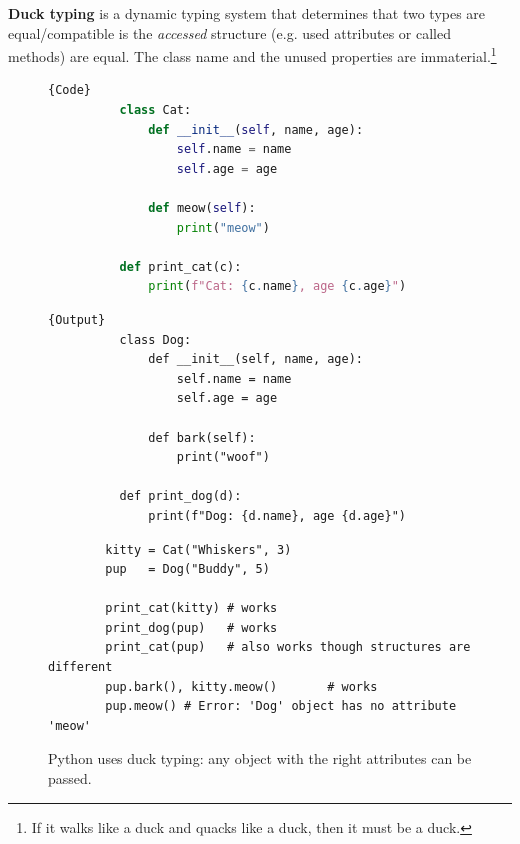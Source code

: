   \begin{definition}
    \label{def:duck-typing}
    \textbf{Duck typing} is a dynamic typing system that determines that two types are equal/compatible is the \textit{accessed} structure (e.g. used attributes or called methods) are equal. The class name and the unused properties are immaterial.\footnote{If it walks like a duck and quacks like a duck, then it must be a duck.} 

    \begin{figure}[H]
      \centering 
      \noindent\begin{minipage}{.5\textwidth}
        \begin{lstlisting}[language=python]{Code}
          class Cat:
              def __init__(self, name, age):
                  self.name = name
                  self.age = age 

              def meow(self): 
                  print("meow")

          def print_cat(c):
              print(f"Cat: {c.name}, age {c.age}")
        \end{lstlisting}
      \end{minipage}
      \hfill
      \begin{minipage}{.49\textwidth}
        \begin{lstlisting}[]{Output}
          class Dog:
              def __init__(self, name, age):
                  self.name = name
                  self.age = age

              def bark(self): 
                  print("woof")

          def print_dog(d):
              print(f"Dog: {d.name}, age {d.age}")
        \end{lstlisting}
      \end{minipage}

      \begin{lstlisting}
        kitty = Cat("Whiskers", 3)
        pup   = Dog("Buddy", 5)

        print_cat(kitty) # works
        print_dog(pup)   # works
        print_cat(pup)   # also works though structures are different
        pup.bark(), kitty.meow()       # works  
        pup.meow() # Error: 'Dog' object has no attribute 'meow'
      \end{lstlisting}
      \caption{Python uses duck typing: any object with the right attributes can be passed.} 
      \label{fig:python_duck}
    \end{figure}
  \end{definition} 

